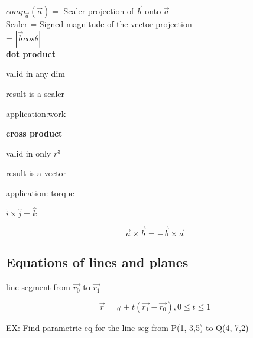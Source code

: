 \documentclass{article}
\begin{document}
$comp_{\vec{a}}(\vec{a}) =$ Scaler projection of $\vec{b}$ onto $\vec{a}$ \\
Scaler           =  Signed magnitude of the vector projection \\
                 = $|\vec{b} cos\theta|$\\


\textbf{dot product}

\begin{list}{-}{}
\item valid in any dim
\item result is a scaler
\item application:work
\end{list}

\textbf{cross product}
\begin{list}{-}{}
\item valid in only $r^3$
\item result is a vector 
\item application: torque
\end{list}

$\hat{i} \times \hat{j} = \hat{k}$

\[\vec{a} \times \vec{b} = -\vec{b} \times \vec{a}\]


\subsection{}

\subsection{Equations of lines and planes}

line segment from $\vec{r_{0}}$ to $\vec{r_{1}}$

\[\vec{r} = \vec{_{0}} +t(\vec{r_{1}} -\vec{r_{0}}), 0\leq t \leq 1\]

\begin{center}
\end{center}
EX: Find parametric eq for the line seg from P(1,-3,5) to Q(4,-7,2)
\end{document}
